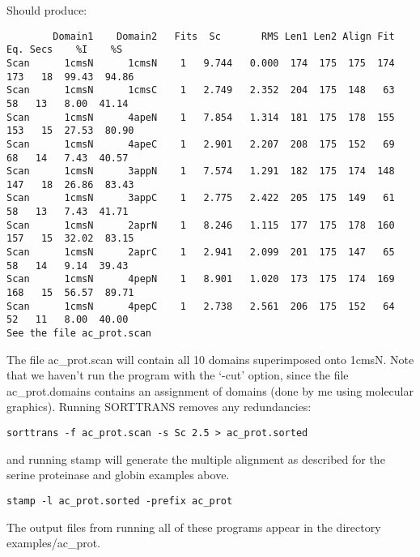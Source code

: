 Should produce:

\begin{scriptsize}\begin{verbatim}
        Domain1    Domain2   Fits  Sc       RMS Len1 Len2 Align Fit   Eq. Secs    %I    %S 
Scan      1cmsN      1cmsN    1   9.744   0.000  174  175  175  174  173   18  99.43  94.86 
Scan      1cmsN      1cmsC    1   2.749   2.352  204  175  148   63   58   13   8.00  41.14 
Scan      1cmsN      4apeN    1   7.854   1.314  181  175  178  155  153   15  27.53  80.90 
Scan      1cmsN      4apeC    1   2.901   2.207  208  175  152   69   68   14   7.43  40.57 
Scan      1cmsN      3appN    1   7.574   1.291  182  175  174  148  147   18  26.86  83.43 
Scan      1cmsN      3appC    1   2.775   2.422  205  175  149   61   58   13   7.43  41.71 
Scan      1cmsN      2aprN    1   8.246   1.115  177  175  178  160  157   15  32.02  83.15 
Scan      1cmsN      2aprC    1   2.941   2.099  201  175  147   65   58   14   9.14  39.43 
Scan      1cmsN      4pepN    1   8.901   1.020  173  175  174  169  168   15  56.57  89.71 
Scan      1cmsN      4pepC    1   2.738   2.561  206  175  152   64   52   11   8.00  40.00 
See the file ac_prot.scan
\end{verbatim} \end{scriptsize}

The file ac\_prot.scan will contain all 10 domains superimposed onto 1cmsN.  Note that
we haven't run the program with the `-cut' option, since the file ac\_prot.domains contains
an assignment of domains (done by me using molecular graphics).  Running
SORTTRANS removes any redundancies:

\begin{scriptsize}\begin{verbatim}
sorttrans -f ac_prot.scan -s Sc 2.5 > ac_prot.sorted
\end{verbatim} \end{scriptsize}

and running stamp will generate the multiple alignment as described for the serine proteinase
and globin examples above.

\begin{scriptsize}\begin{verbatim}
stamp -l ac_prot.sorted -prefix ac_prot
\end{verbatim} \end{scriptsize}

The output files from running all of these programs appear in the directory examples/ac\_prot.

